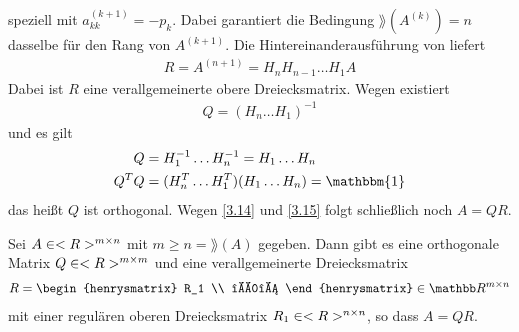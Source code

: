 speziell mit $a_{kk}^{(k+1)}=-p_k$. Dabei garantiert die Bedingung $\rang\left(A^{(k)}\right)=n$ dasselbe für den Rang von $A^{(k+1)}$. Die Hintereinanderausführung von  liefert
\begin{align}
	\label{3.14}
	R = A^{(n+1)} = H_nH_{n-1}\dots H_1A
\end{align}
Dabei ist $R$ eine verallgemeinerte obere Dreiecksmatrix. Wegen  existiert
\begin{align}
	\label{3.15}
	Q = (H_n\dots H_1)^{-1}
\end{align}
und es gilt
\begin{align}
	Q &= H_1^{-1}\dots H_n^{-1} = H_1\dots H_n \notag \\
	Q^TQ &= (H_n^T\dots H_1^T)(H_1\dots H_n) = \mathbbm{1}\notag
\end{align}
das heißt $Q$ ist orthogonal. Wegen \cref{3.14} und \cref{3.15} folgt schließlich noch $A=QR$.

\begin{proposition}
	Sei $A\in<R>^{m\times n}$ mit $m\ge n=\rang(A)$ gegeben. Dann gibt es eine orthogonale Matrix $Q\in<R>^{m\times m}$ und eine verallgemeinerte Dreiecksmatrix
	\begin{align}
		R = \begin{henrysmatrix}
			R_1 \\ \mathbb{0}
		\end{henrysmatrix}\in\real^{m\times n}\notag
	\end{align}
	mit einer regulären oberen Dreiecksmatrix $R_1\in<R>^{n\times n}$, so dass $A=QR$.
\end{proposition}


